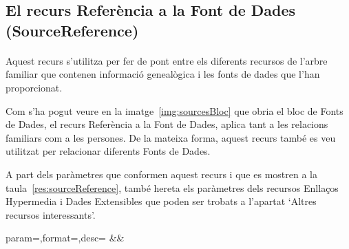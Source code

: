 \subsection{El recurs Referència a la Font de Dades (SourceReference)}

    \paragraph{}
    Aquest recurs s'utilitza per fer de pont entre els diferents recursos de l'arbre fa\-mi\-liar que contenen informació genealògica i les fonts de dades que l'han proporcionat.

    Com s'ha pogut veure en la imatge~\ref{img:sourcesBloc} que obria el bloc de Fonts de Dades, el recurs Referència a la Font de Dades, aplica tant a les relacions familiars com a les persones. De la mateixa forma, aquest recurs també es veu utilitzat per relacionar diferents Fonts de Dades.

    A part dels paràmetres que conformen aquest recurs i que es mostren a la taula~\ref{res:sourceReference}, també hereta els paràmetres dels recursos Enllaços Hypermedia i Dades Extensibles que poden ser trobats a l'apartat `Altres recursos interessants'.

    \begin{center}
             {param=\param,format=\format,desc=\desc}
             {\param&\format&\desc}
     \end{center}
